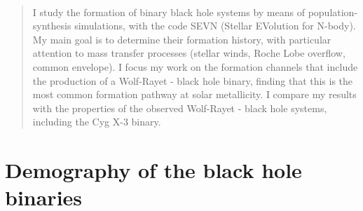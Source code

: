 \documentclass[a4paper,titlepage]{book}     	%
\newenvironment{abstract}{\newpage \thispagestyle{empty} \vspace*{3\baselineskip}
	\begin{center}\Large\textbf\abstractname\end{center}
	\begin{quotation}
	}{\end{quotation}\clearpage}
\begin{document}
\frontmatter

\begin{frontespizio}
	\Preambolo{\renewcommand{\frontinstitutionfont}{\fontsize{15}{12}\bfseries}}
	\Preambolo{\renewcommand{\frontdivisionfont}{\fontsize{16}{30}\selectfont}}
	\Preambolo{\renewcommand{\frontpretitlefont}{\fontsize{16}{20}\scshape}}
	\Preambolo{\renewcommand{\fronttitlefont}{\fontsize{19}{35}\bfseries}}
	\Preambolo{\renewcommand{\frontnamesfont}{\fontsize{15}{20}\bfseries}}
	\Preambolo{\renewcommand{\frontfixednamesfont}{\fontsize{13}{20}\selectfont}}

	\Rientro{2cm}
\end{frontespizio}	

\

\begin{abstract}%
I study the formation of binary black hole systems by means of population-synthesis simulations, with the code SEVN (Stellar EVolution for N-body). My main goal is to determine their formation history, with particular attention to mass transfer processes (stellar winds, Roche Lobe overflow, common envelope). I focus my work on the formation channels that include the production of a Wolf-Rayet - black hole binary, finding that this is the most common formation pathway at solar metallicity. I compare my results with the properties of the observed Wolf-Rayet - black hole systems, including the Cyg X-3 binary.
\end{abstract}

\tableofcontents
{}

\mainmatter

\chapter{Demography of the black hole binaries}
\end{document}
